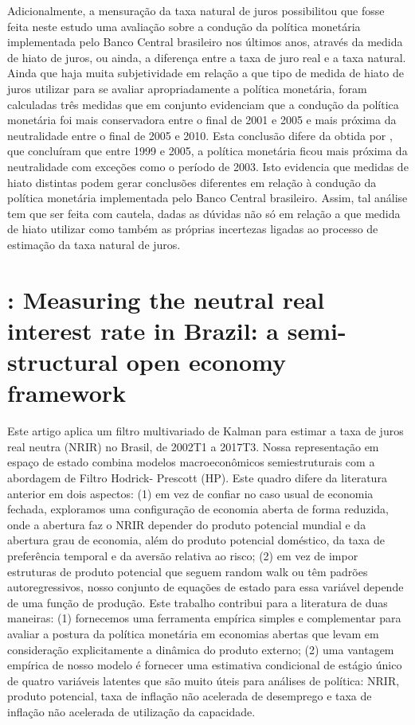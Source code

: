 Adicionalmente, a mensuração da taxa natural de juros possibilitou que fosse feita neste estudo uma avaliação sobre a condução da política monetária implementada pelo Banco Central brasileiro nos últimos anos, através da medida de hiato de juros, ou ainda, a diferença entre a taxa de juro real e a taxa natural. Ainda que haja muita subjetividade em relação a que tipo de medida de hiato de juros utilizar para se avaliar apropriadamente a política monetária, foram calculadas três medidas que em conjunto evidenciam que a condução da política monetária foi mais conservadora entre o final de 2001 e 2005 e mais próxima da neutralidade entre o final de 2005 e 2010. Esta conclusão difere da obtida por \citet{Portugal:2009}, que concluíram que entre 1999 e 2005, a política monetária ficou mais próxima da neutralidade
com exceções como o período de 2003. Isto evidencia que medidas de hiato distintas podem gerar conclusões diferentes em relação à condução da política monetária implementada pelo Banco Central brasileiro. Assim, tal análise tem que ser feita com cautela, dadas as dúvidas não só em relação a que medida de hiato utilizar como também as próprias incertezas ligadas ao processo de estimação da taxa natural de juros.
%
%
\section{\citet{Candido:2018}: Measuring the neutral real interest rate in Brazil: a semi-structural open economy framework}
Este artigo aplica um filtro multivariado de Kalman para estimar a taxa de juros real neutra (NRIR) no Brasil, de 2002T1 a 2017T3. Nossa representação em espaço de estado combina modelos macroeconômicos semiestruturais com a abordagem de Filtro Hodrick- Prescott (HP). Este quadro difere da literatura anterior em dois aspectos: (1) em vez de confiar no caso usual de economia fechada, exploramos uma configuração de economia aberta de forma reduzida, onde a abertura faz o NRIR depender do produto potencial mundial e da abertura grau de economia, além do produto potencial doméstico, da taxa de preferência temporal e da aversão relativa ao risco; (2) em vez de impor estruturas de produto potencial que seguem random walk ou têm padrões autoregressivos, nosso conjunto de equações de estado para essa variável depende de uma função de produção. Este trabalho contribui para a literatura de duas maneiras: (1) fornecemos uma ferramenta empírica simples e complementar para avaliar a postura da política monetária em economias abertas que levam em consideração explicitamente a dinâmica do produto externo; (2) uma vantagem empírica de nosso modelo é fornecer uma estimativa condicional de estágio único de quatro variáveis latentes que são muito úteis para análises de política: NRIR, produto potencial, taxa de inflação não acelerada de desemprego e taxa de inflação não acelerada de utilização da capacidade.

